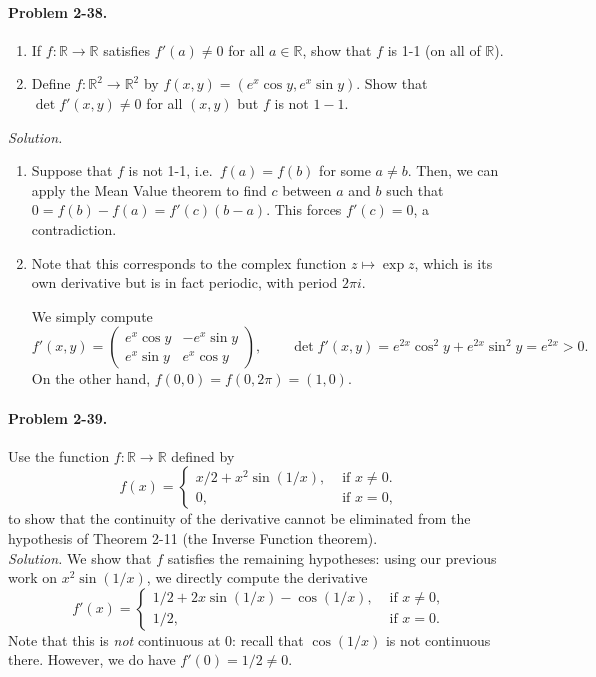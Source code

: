 \documentclass[11pt]{report}
\newcommand{\R}{\mathbb{R}}
\newcommand{\problem}[1]{\paragraph{Problem #1.}}
\newcommand{\solution}{\noindent\textit{Solution.} }
\begin{document}
    \problem{2-38} \begin{enumerate}
        \item If $f\colon \R \to \R$ satisfies $f'(a) \neq 0$ for all $a \in \R$,
        show that $f$ is 1-1 (on all of $\R$).

        \item Define $f\colon \R^2 \to \R^2$ by $f(x, y) = (e^x\cos{y}, e^x\sin{y})$.
        Show that $\det{f'(x, y)} \neq 0$ for all $(x, y)$ but $f$ is not $1-1$.
    \end{enumerate}

    \solution \begin{enumerate}
        \item Suppose that $f$ is not 1-1, i.e.\ $f(a) = f(b)$ for some $a \neq b$.
        Then, we can apply the Mean Value theorem to find $c$ between $a$ and $b$
        such that $0 = f(b) - f(a) = f'(c)(b - a)$. This forces $f'(c) = 0$, a
        contradiction.

        \item Note that this corresponds to the complex function $z \mapsto \exp{z}$,
        which is its own derivative but is in fact periodic, with period $2\pi i$.

        We simply compute \[
            f'(x, y) = \begin{pmatrix}
                e^x\cos{y} & -e^x\sin{y} \\
                e^x\sin{y} & e^x\cos{y}
            \end{pmatrix}, \qquad
            \det{f'(x, y)} = e^{2x}\cos^2{y} + e^{2x}\sin^2{y} = e^{2x} > 0.
        \] On the other hand, $f(0, 0) = f(0, 2\pi) = (1, 0)$.
    \end{enumerate}


    \problem{2-39} Use the function $f\colon \R \to \R$ defined by \[
        f(x) = \begin{cases}
            x / 2 + x^2 \sin(1 / x), &\text{ if } x \neq 0. \\
            0, &\text{ if } x = 0,
        \end{cases}
    \] to show that the continuity of the derivative cannot be eliminated from the
    hypothesis of Theorem 2-11 (the Inverse Function theorem). \\

    \solution We show that $f$ satisfies the remaining hypotheses: using our previous
    work on $x^2 \sin(1 / x)$, we directly compute the derivative \[
        f'(x) = \begin{cases}
            1 / 2 + 2x\sin(1 / x) - \cos(1 / x), &\text{ if } x \neq 0, \\
            1 / 2, &\text{ if } x = 0.
        \end{cases} 
    \] Note that this is \emph{not} continuous at $0$: recall that $\cos(1 / x)$ is
    not continuous there. However, we do have $f'(0) = 1 / 2 \neq 0$.
\end{document}
